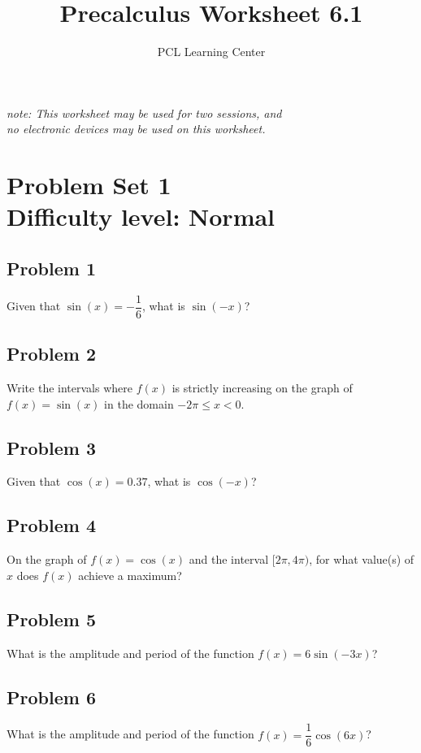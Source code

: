 \documentclass[12pt]{article}
\title{Precalculus Worksheet 6.1}
\author{PCL Learning Center}
\date{}
\begin{document}
\maketitle

\begin{center}
    \textit{note: This worksheet may be used for two sessions, and\\no electronic devices may be used on this worksheet.}
\end{center}

\section*{Problem Set 1\\Difficulty level: Normal}
\subsection*{Problem 1}
Given that \(\sin(x)=-\dfrac{1}{6}\), what is \(\sin(-x)\)?

\subsection*{Problem 2}
Write the intervals where \(f(x)\) is strictly increasing on the graph of \(f(x)=\sin(x)\) in the domain \(-2\pi \leq x < 0\).

\subsection*{Problem 3}
Given that \(\cos(x)=0.37\), what is \(\cos(-x)\)?

\subsection*{Problem 4}
On the graph of \(f(x)=\cos(x)\) and the interval \([2\pi,4\pi)\), for what value(s) of \(x\) does \(f(x)\) achieve a maximum?

\subsection*{Problem 5} What is the amplitude and period of the function \(f(x)=6\sin(-3x)\)?

\subsection*{Problem 6}
What is the amplitude and period of the function \(f(x)=\dfrac{1}{6}\cos(6x)\)?
\end{document}
